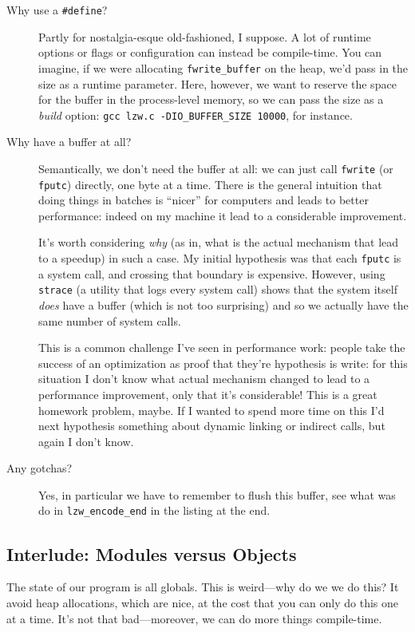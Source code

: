 \documentclass{scrartcl}
\begin{document}
\begin{description}
    \item[Why use a \texttt{\#define}?] 
    Partly for nostalgia-esque old-fashioned, I suppose.
    A lot of runtime options or flags or configuration can instead be compile-time.
    You can imagine, if we were allocating \texttt{fwrite\_buffer} on the heap, we'd pass in the size as a runtime parameter.
    Here, however, we want to reserve the space for the buffer in the process-level memory, so we can pass the size as a \emph{build} option: \texttt{gcc lzw.c -DIO\_BUFFER\_SIZE 10000}, for instance.
    \item[Why have a buffer at all?] Semantically, we don't need the buffer at all: we can just call \texttt{fwrite} (or \texttt{fputc}) directly, one byte at a time.
    There is the general intuition that doing things in batches is ``nicer'' for computers and leads to better performance: indeed on my machine it lead to a considerable improvement.

    It's worth considering \emph{why} (as in, what is the actual mechanism that lead to a speedup) in such a case.
    My initial hypothesis was that each \texttt{fputc} is a system call, and crossing that boundary is expensive.
    However, using \texttt{strace} (a utility that logs every system call) shows that the system itself \emph{does} have a buffer (which is not too surprising) and so we actually have the same number of system calls.

    This is a common challenge I've seen in performance work: people take the success of an optimization as proof that they're hypothesis is write: for this situation I don't know what actual mechanism changed to lead to a performance improvement, only that it's considerable!
    This is a great homework problem, maybe.
    If I wanted to spend more time on this I'd next hypothesis something about dynamic linking or indirect calls, but again I don't know.
    \item[Any gotchas?] Yes, in particular we have to remember to flush this buffer, see what was do in \texttt{lzw\_encode\_end} in the listing at the end.
\end{description}


\subsection{Interlude: Modules versus Objects}
The state of our program is all globals.
This is weird---why do we we do this?
It avoid heap allocations, which are nice, at the cost that you can only do this one at a time.
It's not that bad---moreover, we can do more things compile-time.
\end{document}
